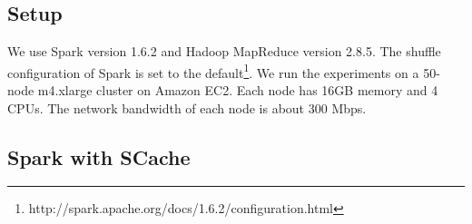 
\subsection{Setup}\label{stepup}
We use Spark version 1.6.2 and Hadoop MapReduce version 2.8.5.
The shuffle configuration of Spark is set to the default\footnote{http://spark.apache.org/docs/1.6.2/configuration.html}. 
We run the experiments on a 50-node m4.xlarge cluster on Amazon EC2.
Each node has 16GB memory and 4 CPUs.
The network bandwidth of each node is about 300 Mbps.

\subsection{Spark with SCache}\label{sparkscache}

